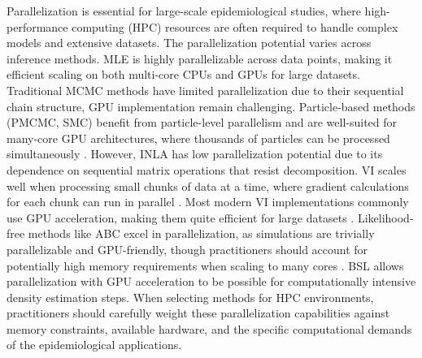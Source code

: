 \documentclass{article}
\begin{document}
Parallelization is essential for large-scale epidemiological studies, where high-performance computing (HPC) resources are often required to handle complex models and extensive datasets. The parallelization potential varies across inference methods. MLE is highly parallelizable across data points, making it efficient scaling on both multi-core CPUs and GPUs for large datasets. Traditional MCMC methods have limited parallelization due to their sequential chain structure, GPU implementation remain challenging. Particle-based methods (PMCMC, SMC) benefit from particle-level parallelism and are well-suited for many-core GPU architectures, where thousands of particles can be processed simultaneously \citep{henriksen2012parallel}. However, INLA has low parallelization potential due to its dependence on sequential matrix operations that resist decomposition. VI scales well when processing small chunks of data at a time, where gradient calculations for each chunk can run in parallel \citep{hoffman2013stochastic}. Most modern VI implementations commonly use GPU acceleration, making them quite efficient for large datasets \citep{bingham2019pyro}. Likelihood-free methods like ABC excel in parallelization, as simulations are trivially parallelizable and GPU-friendly, though practitioners should account for potentially high memory requirements when scaling to many cores \citep{kulkarni2022hardware}. BSL allows parallelization with GPU acceleration to be possible for computationally intensive density estimation steps. When selecting methods for HPC environments, practitioners should carefully weight these parallelization capabilities against memory constraints, available hardware, and the specific computational demands of the epidemiological applications.
\end{document}
